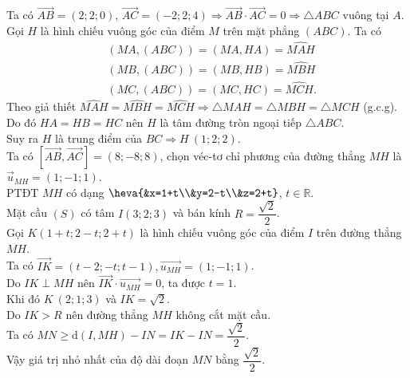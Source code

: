 \begin{ex}
{\begin{center}
		\end{center}	
		Ta có $\overrightarrow{A B}=(2 ; 2 ; 0)$, $\overrightarrow{A C}=(-2 ; 2 ; 4) \Rightarrow \overrightarrow{A B} \cdot \overrightarrow{A C}=0 \Rightarrow \triangle ABC$ vuông tại $A$.\\
		Gọi $H$ là hình chiếu vuông góc của điểm $M$ trên mặt phẳng $(A B C)$. Ta có
		$$
		\begin{aligned}
			& (MA, (ABC))=(MA, HA)=\widehat{MAH} \\
			& (MB, (ABC))=(MB, HB)=\widehat{MBH} \\
			& (MC, (ABC))=(MC, HC)=\widehat{MCH}.
		\end{aligned}
		$$
		Theo giả thiết $\widehat{MAH}=\widehat{MBH}=\widehat{MCH} \Rightarrow \triangle MAH=\triangle MBH=\triangle MCH$ (g.c.g).\\
		Do đó $HA=HB=HC$ nên $H$ là tâm đường tròn ngoại tiếp $\triangle ABC$.\\
		Suy ra $H$ là trung điểm của $BC\Rightarrow H\ (1; 2; 2)$.\\
		Ta có $[\overrightarrow{AB}, \overrightarrow{AC}]=(8;-8; 8)$, chọn véc-tơ  chỉ phương của đường thẳng $MH$ là $\overrightarrow{u}_{MH}=(1;-1; 1)$. \\
		PTĐT $MH$ có dạng $\heva{&x=1+t\\&y=2-t\\&z=2+t}$, $t\in \mathbb{R}$.\\
		Mặt cầu $(S)$ có tâm $I(3 ; 2 ; 3)$ và bán kính $R=\dfrac{\sqrt{2}}{2}$.\\
		Gọi $K(1+t; 2-t; 2+t)$ là hình chiếu vuông góc của điểm $I$ trên đường thẳng $MH$.\\
		Ta có $\overrightarrow{IK}=(t-2;-t; t-1), \overrightarrow{u_{MH}}=(1;-1; 1)$.\\
		Do $IK\perp MH$ nên $\overrightarrow{IK} \cdot \overrightarrow{u_{MH}}=0$, ta được $t=1$.\\
		Khi đó $K\ (2; 1; 3)$ và $IK=\sqrt{2}$.\\
		Do $IK > R$ nên đường thẳng $MH$ không cắt mặt cầu.\\
		Ta có $MN\geq \mathrm{d}(I, MH)-IN=IK-IN=\dfrac{\sqrt{2}}{2}$.\\
		Vậy giá trị nhỏ nhất của độ dài đoạn $M N$ bằng $\dfrac{\sqrt{2}}{2}$.
	}
\end{ex}
